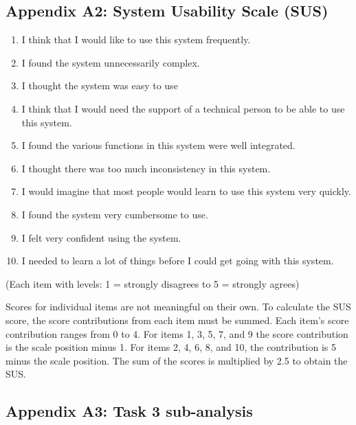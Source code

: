 \documentclass[
]{book}
\providecommand{\tightlist}{%
  \setlength{\itemsep}{0pt}\setlength{\parskip}{0pt}}
\begin{document}
\hypertarget{appendix-a2-system-usability-scale-sus}{%
\subsection*{Appendix A2: System Usability Scale (SUS)}\label{appendix-a2-system-usability-scale-sus}}

\begin{enumerate}
\def\labelenumi{\arabic{enumi}.}
\tightlist
\item
  I think that I would like to use this system frequently.
\item
  I found the system unnecessarily complex.
\item
  I thought the system was easy to use
\item
  I think that I would need the support of a technical person to be able to use this system.
\item
  I found the various functions in this system were well integrated.
\item
  I thought there was too much inconsistency in this system.
\item
  I would imagine that most people would learn to use this system very quickly.
\item
  I found the system very cumbersome to use.
\item
  I felt very confident using the system.
\item
  I needed to learn a lot of things before I could get going with this system.
\end{enumerate}

(Each item with levels: 1 = strongly disagrees to 5 = strongly agrees)

Scores for individual items are not meaningful on their own. To calculate the SUS score, the score contributions from each item must be summed. Each item's score contribution ranges from 0 to 4. For items 1, 3, 5, 7, and 9 the score contribution is the scale position minus 1. For items 2, 4, 6, 8, and 10, the contribution is 5 minus the scale position. The sum of the scores is multiplied by 2.5 to obtain the SUS.

\hypertarget{appendix-a3-task-3-sub-analysis}{%
\subsection*{Appendix A3: Task 3 sub-analysis}\label{appendix-a3-task-3-sub-analysis}}
\end{document}
